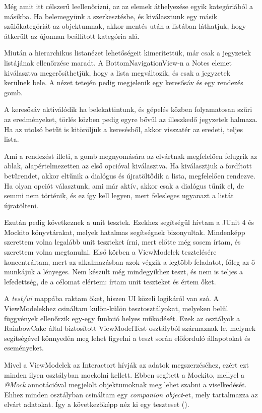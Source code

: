 Még amit itt célszerű leellenőrizni, az az elemek áthelyezése egyik kategóriából a másikba. Ha belemegyünk a szerkesztésbe, és kiválasztunk egy másik szülőkategóriát az objektumnak, akkor mentés után a listában láthatjuk, hogy átkerült az újonnan beállított kategória alá. 

Miután a hierarchikus listanézet lehetőségeit kimerítettük, már csak a jegyzetek listájának ellenőrzése maradt. A BottomNavigationView-n a Notes elemet kiválasztva megerősíthetjük, hogy a lista megváltozik, és csak a jegyzetek kerülnek bele. A nézet tetején pedig megjelenik egy keresősáv és egy rendezés gomb.

A keresősáv aktiválódik ha belekattintunk, és gépelés közben folyamatosan szűri az eredményeket, törlés közben pedig egyre bővül az illeszkedő jegyzetek halmaza. Ha az utolsó betűt is kitöröljük a keresésből, akkor visszatér az eredeti, teljes lista. 

Ami a rendezést illeti, a gomb megnyomására az elvártnak megfelelően felugrik az ablak, alapértelmezetten az első opcióval kiválasztva. Ha kiválasztjuk a fordított betűrendet, akkor eltűnik a dialógus és újratöltődik a lista, megfelelően rendezve. Ha olyan opciót választunk, ami már aktív, akkor csak a dialógus tűnik el, de semmi nem történik, és ez így kell legyen, mert felesleges ugyanazt a listát újratölteni.

Ezután pedig következnek a unit tesztek. Ezekhez segítségül hívtam a JUnit 4 és Mockito könyvtárakat, melyek hatalmas segítségnek bizonyultak. Mindenképp szerettem volna legalább unit teszteket írni, mert előtte még sosem írtam, és szerettem volna megtanulni. Első körben a ViewModelek tesztelésére koncentráltam, mert az alkalmazásban azok végzik a legtöbb feladatot, főleg az ő munkájuk a lényeges. Nem készült még mindegyikhez teszt, és nem is teljes a lefedettség, de a célomat elértem: írtam unit teszteket és értem őket. 

A \emph{test/ui} mappába raktam őket, hiszen UI közeli logikáról van szó. A ViewModelekhez csináltam külön-külön tesztosztályokat, melyeken belül függvények ellenőrzik egy-egy funkció helyes működését. Ezek az osztályok a RainbowCake által biztosított ViewModelTest osztályból származnak le, melynek segítségével könnyedén meg lehet figyelni a teszt során előforduló állapotokat és eseményeket. 

Mivel a ViewModelek az Interactort hívják az adatok megszerzéséhez, ezért ezt minden ilyen osztályban mockolni kellett. Ebben segített a Mockito, mellyel a \emph{@Mock} annotációval megjelölt objektumoknak meg lehet szabni a viselkedését. Ehhez minden osztályban csináltam egy \emph{companion object}-et, mely tartalmazza az elvárt adatokat. Így a következőképp néz ki egy teszteset ().

